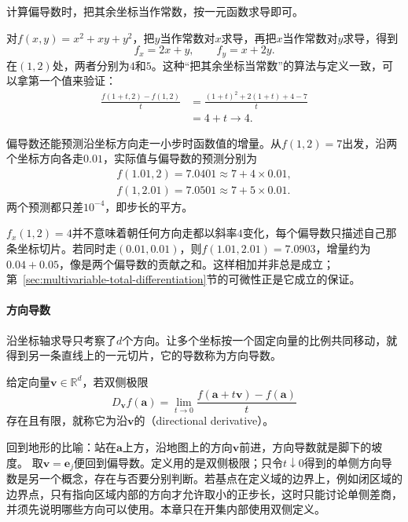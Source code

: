 计算偏导数时，把其余坐标当作常数，按一元函数求导即可。
\begin{example}[二次函数的偏导数]
\label{ex:multivariable-quadratic-partials}
对$f(x,y)=x^2+xy+y^2$，把$y$当作常数对$x$求导，再把$x$当作常数对$y$求导，得到
\[
 f_x=2x+y,\qquad f_y=x+2y.
\]
在$(1,2)$处，两者分别为$4$和$5$。这种“把其余坐标当常数”的算法与定义一致，可以拿第一个值来验证：
\[
 \begin{aligned}
 \frac{f(1+t,2)-f(1,2)}t
 &=\frac{(1+t)^2+2(1+t)+4-7}{t}\\
 &=4+t\longrightarrow4.
 \end{aligned}
\]

偏导数还能预测沿坐标方向走一小步时函数值的增量。从$f(1,2)=7$出发，沿两个坐标方向各走$0.01$，实际值与偏导数的预测分别为
\[
 \begin{gathered}
 f(1.01,2)=7.0401\approx7+4\times0.01,\\
 f(1,2.01)=7.0501\approx7+5\times0.01.
 \end{gathered}
\]
两个预测都只差$10^{-4}$，即步长的平方。
\end{example}

$f_x(1,2)=4$并不意味着朝任何方向走都以斜率$4$变化，每个偏导数只描述自己那条坐标切片。若同时走$(0.01,0.01)$，则$f(1.01,2.01)=7.0903$，增量约为$0.04+0.05$，像是两个偏导数的贡献之和。这样相加并非总是成立；第~\ref{sec:multivariable-total-differentiation}节的可微性正是它成立的保证。

\paragraph{方向导数}

沿坐标轴求导只考察了$d$个方向。让多个坐标按一个固定向量的比例共同移动，就得到另一条直线上的一元切片，它的导数称为方向导数。
\begin{definition}[方向导数]
\label{def:multivariable-directional-derivative}
给定向量$\bm v\in\mathbb R^d$，若双侧极限
\begin{equation}
 D_{\bm v}f(\bm a)
 =\lim_{t\to0}\frac{f(\bm a+t\bm v)-f(\bm a)}t
\label{eq:multivariable-directional-derivative}
\end{equation}
存在且有限，就称它为沿$\bm v$的（directional derivative）。
\end{definition}
回到地形的比喻：站在$\bm a$上方，沿地图上的方向$\bm v$前进，方向导数就是脚下的坡度。
取$\bm v=\bm e_j$便回到偏导数。定义用的是双侧极限；只令$t\downarrow0$得到的单侧方向导数是另一个概念，存在与否要分别判断。若基点在定义域的边界上，例如闭区域的边界点，只有指向区域内部的方向才允许取小的正步长，这时只能讨论单侧差商，并须先说明哪些方向可以使用。本章只在开集内部使用双侧定义。

